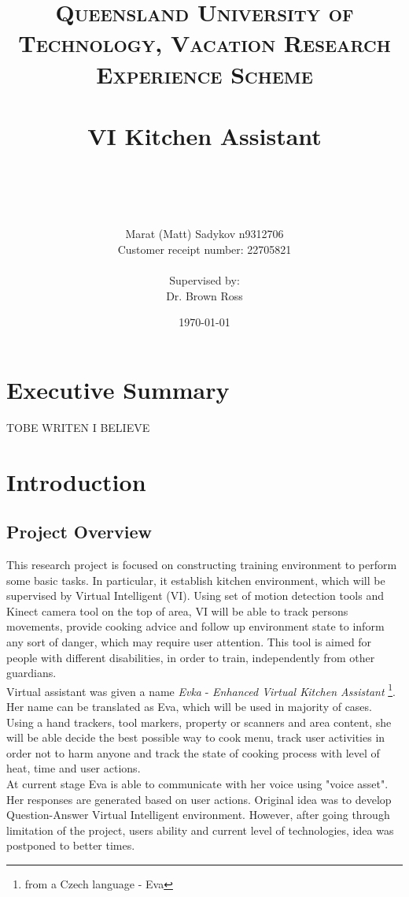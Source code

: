 \documentclass[18pt]{article}
\title{	
	\normalfont \normalsize 
	\textsc{Queensland University of Technology, Vacation Research Experience Scheme} \\ [25pt] 
	\horrule{0.5pt} \\[0.4cm] %
	\huge VI Kitchen Assistant \\ %
	\author{Marat (Matt) Sadykov \small n9312706 \\  Customer receipt number: \small 22705821 \\ \\ Supervised by: \\ Dr. Brown Ross \\ }
	\date{\normalsize\today} %
	\horrule{2pt} \\[0.5cm] %
}
\numberwithin{equation}{section} %
\numberwithin{figure}{section} %
\numberwithin{table}{section} %
\begin{document}
\maketitle
\newpage
\renewcommand*\contentsname{Table of Contents}
\tableofcontents
\listoffigures
\newpage
\section{Executive Summary}
	TOBE WRITEN I BELIEVE
\section{Introduction}
\subsection{Project Overview}
	This research project is focused on constructing training environment to perform some basic tasks. In particular, it establish kitchen environment, which will be supervised by Virtual Intelligent (VI). Using set of motion detection tools and Kinect camera tool on the top of area, VI will be able to track persons movements, provide cooking advice and follow up environment state to inform any sort of danger, which may require user attention. This tool is aimed for people with different disabilities, in order to train, independently from other guardians. \\
		
	Virtual assistant was given a name \textit{Evka} - \textit{Enhanced Virtual Kitchen Assistant} \footnote{from a Czech language - Eva}. Her name can be translated as Eva, which will be used in majority of cases. Using a hand trackers, tool markers, property or scanners and area content, she will be able decide the best possible way to cook menu, track user activities in order not to harm anyone and track the state of cooking process with level of heat, time and user actions. \\	
	
	At current stage Eva is able to communicate with her voice using "voice asset". Her responses are generated based on user actions. Original idea was to develop Question-Answer Virtual Intelligent environment. However, after going through limitation of the project, users ability and current level of technologies, idea was postponed to better times. \\	
	
\end{document}
